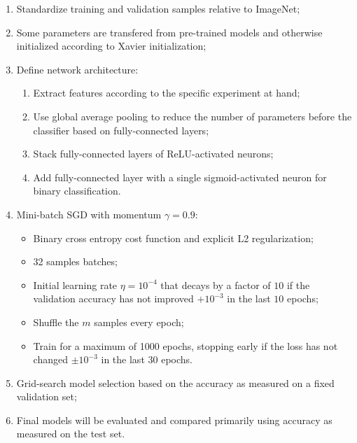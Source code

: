 \begin{enumerate}
    \item Standardize training and validation samples relative to ImageNet;
    \item Some parameters are transfered from pre-trained models and otherwise initialized according to Xavier initialization;
    \item Define network architecture:
        \begin{enumerate}
            \item Extract features according to the specific experiment at hand;
            \item Use global average pooling to reduce the number of parameters before the classifier based on fully-connected layers;
            \item Stack fully-connected layers of ReLU-activated neurons;
            \item Add fully-connected layer with a single sigmoid-activated neuron for binary classification.
        \end{enumerate}
    \item Mini-batch \ac{SGD} with momentum $\gamma = 0.9$:
        \begin{itemize}
            \item Binary cross entropy cost function and explicit L2 regularization;
            \item 32 samples batches;
            \item Initial learning rate $\eta = 10^{-4}$ that decays by a factor of $10$ if the validation accuracy has not improved $+10^{-3}$ in the last $10$ epochs;
            \item Shuffle the $m$ samples every epoch;
            \item Train for a maximum of 1000 epochs, stopping early if the loss has not changed $\pm 10^{-3}$ in the last $30$ epochs.
        \end{itemize}
    \item Grid-search model selection based on the accuracy as measured on a fixed validation set;
    \item Final models will be evaluated and compared primarily using accuracy as measured on the test set.
\end{enumerate}


